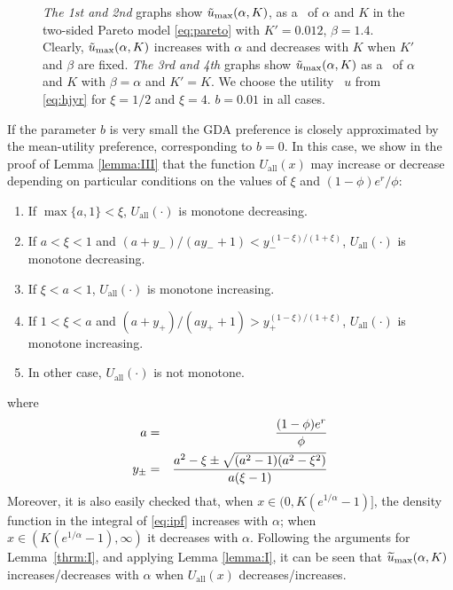 \begin{figure}[htb!]
\begin{minipage}{0.25\linewidth}
  \end{minipage}
  \caption{
   {\em The 1st and 2nd} graphs show
   $\tilde u_{\rm max}(\alpha, K)$, as a \fct\ of $\alpha$ and $K$
   in the two-sided Pareto model \eqref{eq:pareto} with $K'=0.012$,
   $\beta = 1.4$.
   Clearly, $\tilde u_{\rm max}(\alpha, K)$ increases with $\alpha$
   and decreases with $K$ when $K'$ and $\beta$ are fixed.
   {\em The 3rd and 4th} graphs show
   $\tilde u_{\rm max}(\alpha, K)$ as a \fct\ of $\alpha$
   and $K$ with $\beta = \alpha$ and $K' = K$.
   We choose the utility \fct\ $u$ from \eqref{eq:hjyr} for $\xi = 1/2$
   and $\xi = 4$. $b = 0.01$ in all cases.
  }
  \label{fig:preference_pareto}
\end{figure}

If the parameter $b$ is very small the GDA preference is closely
approximated by the mean-utility preference, corresponding to $b = 0$. 
In this case, we show in the proof of Lemma \ref{lemma:III} that the function
$U_{\text{all}}(x)$ may increase or decrease depending on particular conditions
on the values of $\xi$ and $(1 - \phi) e^r / \phi$:
\begin{enumerate}
\item If $\max\{a, 1\} < \xi$, $U_{\text{all}}(\cdot)$ is
  monotone decreasing.
\item If $a < \xi < 1$ and $(a + y_-)/(a y_- + 1) <
  y_-^{(1-\xi)/(1+\xi)}$, $U_{\text{all}}(\cdot)$ is monotone
  decreasing.
\item If $\xi < a < 1$, $U_{\text{all}}(\cdot)$ is monotone
  increasing.
\item If $1 < \xi < a$ and $(a + y_+)/(a y_+ + 1) >
  y_+^{(1-\xi)/(1+\xi)}$, $U_{\text{all}}(\cdot)$ is monotone
  increasing.
\item In other case, $U_{\text{all}}(\cdot)$ is not monotone.
\end{enumerate}
where
\begin{eqnarray*}
a &=& {
  (1 - \phi) e^r
  \over
  \phi
} \\
y_\pm &=& {
  a^2 - \xi \pm \sqrt{(a^2 - 1) (a^2 - \xi^2)}
  \over
  a (\xi - 1)
}
\end{eqnarray*}
Moreover, it is also easily checked that, when
$x \in (0, K(e^{1/\alpha} - 1)]$,
the density function in the integral of \eqref{eq:ipf} increases
with $\alpha$; when $x \in (K(e^{1/\alpha} - 1), \infty)$ it 
decreases with $\alpha$. Following the arguments for Lemma~\ref{thrm:I},
and applying Lemma \ref{lemma:I}, it can be seen that
$\widetilde u_{\rm max}(\alpha, K)$ increases/decreases with $\alpha$ when
$U_{\text{all}}(x)$  decreases/increases.

